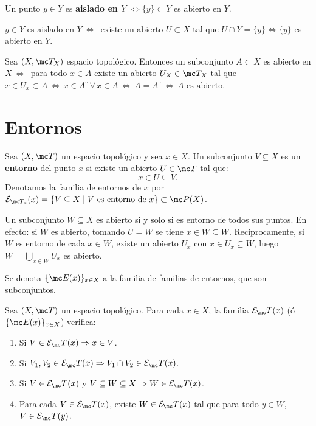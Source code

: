 \begin{prop}
    Un punto $y\in Y$ es \textbf{aislado en $Y$} $\iff \{y\} \subset Y$ es abierto en $Y$.
\end{prop}
\begin{dem}
    $y \in Y$ es aislado en $Y \,\iff \, $ existe un abierto $U \subset X$ tal que $U\cap Y = \{y\} \iff \{y\}$ es abierto en $Y$.
\end{dem}
\begin{prop}
    Sea $(X, \mc T_X)$ espacio topol\'ogico. Entonces un subconjunto $A\subset X$ es abierto en $X\, \iff \, $ para todo $x\in A$ existe un abierto $U_X \in \mc T_X$ tal que $x\in U_x\subset A \, \iff \, x\in A^{\circ} \, \forall \, x \in A \, \iff \, A = A^{\circ} \, \iff \, A \text{ es abierto. }$
\end{prop}

\section{Entornos}
\begin{defi}
Sea \((X, \mc T)\) un espacio topológico y sea \(x \in X\). Un subconjunto \(V \subseteq X\) es un \textbf{entorno} del punto \(x\) si existe un abierto \(U \in \mc T\) tal que:
\[
    x \in U \subseteq V \text{}.
\]
Denotamos la familia de entornos de \(x\) por \(\mathcal{E}_{\mc T_x}(x) = \{V \subseteq X \mid V \text{ es entorno de } x\} \subset \mc P (X)\).
\end{defi}

\begin{obs}
Un subconjunto \(W \subseteq X\) es abierto si y solo si es entorno de todos sus puntos. En efecto: si \(W\) es abierto, tomando \(U = W\) se tiene \(x \in W \subseteq W\). Recíprocamente, si \(W\) es entorno de cada \(x \in W\), existe un abierto \(U_x\) con \(x \in U_x \subseteq W\), luego \(\displaystyle W = \bigcup_{x \in W} U_x\) es abierto.
\end{obs}
Se denota $\{ \mc E(x)\}_{x \in X}$ a la familia de familias de entornos, que son subconjuntos.
\begin{teo}
Sea \((X, \mc T)\) un espacio topológico. Para cada \(x \in X\), la familia \(\mathcal{E}_\mc T(x)\) (\'o $\{ \mc E(x)\}_{x \in X}$) verifica:
\begin{enumerate}
    \item[\textbf{1)}] Si \(V \in \mathcal{E}_\mc T(x) \Rightarrow x \in V\).
    \item[\textbf{2)}] Si \(V_1, V_2 \in \mathcal{E}_\mc T(x) \Rightarrow V_1 \cap V_2 \in \mathcal{E}_\mc T(x)\).
    \item[\textbf{3)}] Si \(V \in \mathcal{E}_\mc T(x)\) y \(V \subseteq W \subseteq X \Rightarrow W \in \mathcal{E}_\mc T(x)\).
    \item[\textbf{4)}] Para cada \(V \in \mathcal{E}_\mc T(x)\), existe \(W \in \mathcal{E}_\mc T(x)\) tal que para todo \(y \in W\), \(V \in \mathcal{E}_\mc T(y)\).
\end{enumerate}
\end{teo}

